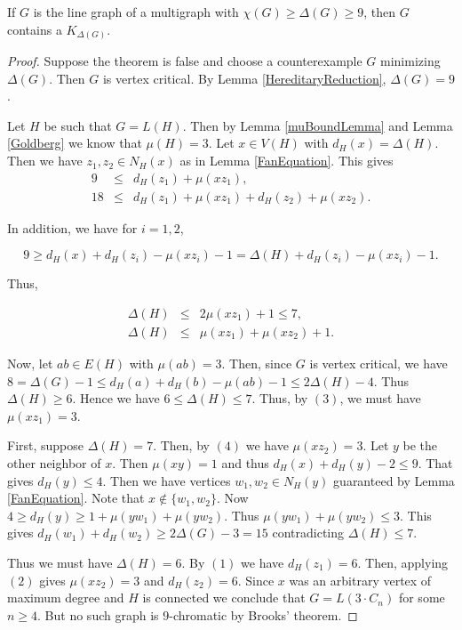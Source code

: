 \begin{thm}\label{BKLineGraph}
If $G$ is the line graph of a multigraph with $\chi(G) \geq \Delta(G) \geq 9$, then  $G$ contains a $K_{\Delta(G)}$.
\end{thm} 
\begin{proof}

Suppose the theorem is false and choose a counterexample $G$ minimizing $\Delta(G)$.  Then $G$ is vertex critical.  By Lemma \ref{HereditaryReduction}, $\Delta(G) = 9$.

Let $H$ be such that $G = L(H)$.  Then by Lemma \ref{muBoundLemma} and Lemma \ref{Goldberg} we know that $\mu(H) = 3$. Let $x \in V(H)$ with $d_H(x) = \Delta(H)$.  Then we have $z_1, z_2 \in N_H(x)$ as in Lemma \ref{FanEquation}.  This gives
\begin{eqnarray}
9 &\leq& d_H(z_1) + \mu(xz_1), \\
18 &\leq& d_H(z_1) + \mu(xz_1) + d_H(z_2) + \mu(xz_2).
\end{eqnarray}

\noindent In addition, we have for $i = 1,2$, 

\[9 \geq d_H(x) + d_H(z_i) - \mu(xz_i) - 1 = \Delta(H) + d_H(z_i) - \mu(xz_i) - 1.\]

\noindent Thus,

\begin{eqnarray}
\Delta(H) &\leq& 2\mu(xz_1) + 1 \leq 7, \\
\Delta(H) &\leq& \mu(xz_1) + \mu(xz_2) + 1.
\end{eqnarray}

Now, let $ab \in E(H)$ with $\mu(ab) = 3$.  Then, since $G$ is vertex critical, we have $8 = \Delta(G) - 1 \leq d_H(a) + d_H(b) - \mu(ab) - 1 \leq 2\Delta(H) - 4$.  Thus $\Delta(H) \geq 6$.  Hence we have $6 \leq \Delta(H) \leq 7$.  Thus, by $(3)$, we must have $\mu(xz_1) = 3$.

First, suppose $\Delta(H) = 7$.  Then, by $(4)$ we have $\mu(xz_2) = 3$.  Let $y$ be the other neighbor of $x$.  Then $\mu(xy) = 1$ and thus $d_H(x) + d_H(y) - 2 \leq 9$.  That gives $d_H(y) \leq 4$.  Then we have vertices $w_1, w_2 \in N_H(y)$ guaranteed by Lemma \ref{FanEquation}. Note that $x \not \in \{w_1, w_2\}$.  Now $4 \geq d_H(y) \geq 1 + \mu(yw_1) + \mu(yw_2)$.  Thus $\mu(yw_1) + \mu(yw_2) \leq 3$.  This gives $d_H(w_1) + d_H(w_2) \geq 2\Delta(G) - 3 = 15$ contradicting $\Delta(H) \leq 7$.

Thus we must have $\Delta(H) = 6$.  By $(1)$ we have $d_H(z_1) = 6$.  Then, applying $(2)$ gives $\mu(xz_2) = 3$ and $d_H(z_2) = 6$.  Since $x$ was an arbitrary vertex of maximum degree and $H$ is connected we conclude that $G = L(3\cdot C_n)$ for some $n \geq 4$.  But no such graph is $9$-chromatic by Brooks' theorem.
\end{proof}

